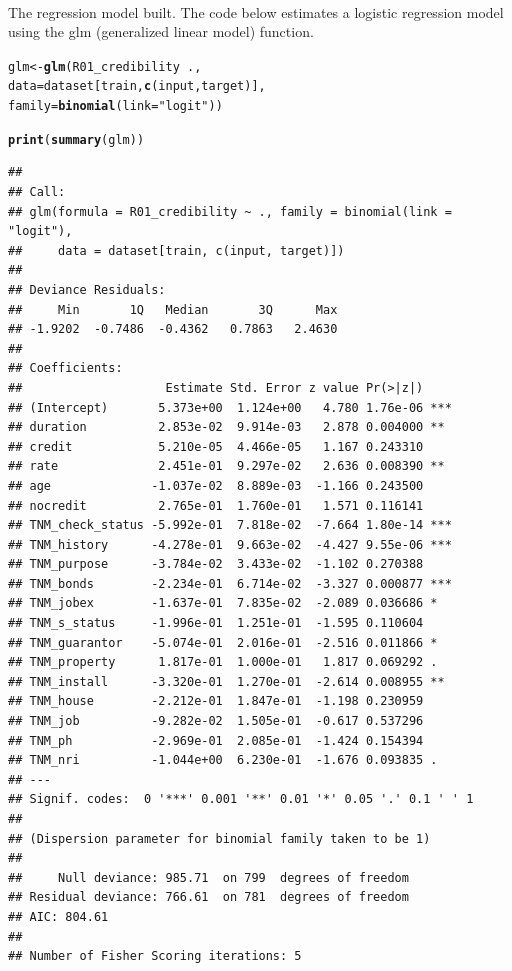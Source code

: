 \documentclass{article}\usepackage[]{graphicx}\usepackage[]{color}
\makeatletter
\newcommand{\hlstr}[1]{\textcolor[rgb]{0.192,0.494,0.8}{#1}}%
\newcommand{\hlopt}[1]{\textcolor[rgb]{0,0,0}{#1}}%
\newcommand{\hlstd}[1]{\textcolor[rgb]{0.345,0.345,0.345}{#1}}%
\newcommand{\hlkwb}[1]{\textcolor[rgb]{0.69,0.353,0.396}{#1}}%
\newcommand{\hlkwc}[1]{\textcolor[rgb]{0.333,0.667,0.333}{#1}}%
\newcommand{\hlkwd}[1]{\textcolor[rgb]{0.737,0.353,0.396}{\textbf{#1}}}%
\newenvironment{kframe}{%
 \def\at@end@of@kframe{}%
 \ifinner\ifhmode%
  \def\at@end@of@kframe{\end{minipage}}%
  \begin{minipage}{\columnwidth}%
 \fi\fi%
 \def\FrameCommand##1{\hskip\@totalleftmargin \hskip-\fboxsep
 \colorbox{shadecolor}{##1}\hskip-\fboxsep
     \hskip-\linewidth \hskip-\@totalleftmargin \hskip\columnwidth}%
 \MakeFramed {\advance\hsize-\width
   \@totalleftmargin\z@ \linewidth\hsize
   \@setminipage}}%
 {\par\unskip\endMakeFramed%
 \at@end@of@kframe}
\newenvironment{knitrout}{}{} %
\makeatother
\begin{document}
\\ The regression model built. The code below estimates a logistic regression model using the glm (generalized linear model) function.
\begin{knitrout}
\color{fgcolor}\begin{kframe}
\begin{alltt}
\hlstd{glm} \hlkwb{<-} \hlkwd{glm}\hlstd{(R01_credibility} \hlopt{~} \hlstd{.,}
               \hlkwc{data}\hlstd{=dataset[train,} \hlkwd{c}\hlstd{(input, target)],}
               \hlkwc{family}\hlstd{=}\hlkwd{binomial}\hlstd{(}\hlkwc{link}\hlstd{=}\hlstr{"logit"}\hlstd{))}

\hlkwd{print}\hlstd{(}\hlkwd{summary}\hlstd{(glm))}
\end{alltt}
\begin{verbatim}
## 
## Call:
## glm(formula = R01_credibility ~ ., family = binomial(link = "logit"), 
##     data = dataset[train, c(input, target)])
## 
## Deviance Residuals: 
##     Min       1Q   Median       3Q      Max  
## -1.9202  -0.7486  -0.4362   0.7863   2.4630  
## 
## Coefficients:
##                    Estimate Std. Error z value Pr(>|z|)    
## (Intercept)       5.373e+00  1.124e+00   4.780 1.76e-06 ***
## duration          2.853e-02  9.914e-03   2.878 0.004000 ** 
## credit            5.210e-05  4.466e-05   1.167 0.243310    
## rate              2.451e-01  9.297e-02   2.636 0.008390 ** 
## age              -1.037e-02  8.889e-03  -1.166 0.243500    
## nocredit          2.765e-01  1.760e-01   1.571 0.116141    
## TNM_check_status -5.992e-01  7.818e-02  -7.664 1.80e-14 ***
## TNM_history      -4.278e-01  9.663e-02  -4.427 9.55e-06 ***
## TNM_purpose      -3.784e-02  3.433e-02  -1.102 0.270388    
## TNM_bonds        -2.234e-01  6.714e-02  -3.327 0.000877 ***
## TNM_jobex        -1.637e-01  7.835e-02  -2.089 0.036686 *  
## TNM_s_status     -1.996e-01  1.251e-01  -1.595 0.110604    
## TNM_guarantor    -5.074e-01  2.016e-01  -2.516 0.011866 *  
## TNM_property      1.817e-01  1.000e-01   1.817 0.069292 .  
## TNM_install      -3.320e-01  1.270e-01  -2.614 0.008955 ** 
## TNM_house        -2.212e-01  1.847e-01  -1.198 0.230959    
## TNM_job          -9.282e-02  1.505e-01  -0.617 0.537296    
## TNM_ph           -2.969e-01  2.085e-01  -1.424 0.154394    
## TNM_nri          -1.044e+00  6.230e-01  -1.676 0.093835 .  
## ---
## Signif. codes:  0 '***' 0.001 '**' 0.01 '*' 0.05 '.' 0.1 ' ' 1
## 
## (Dispersion parameter for binomial family taken to be 1)
## 
##     Null deviance: 985.71  on 799  degrees of freedom
## Residual deviance: 766.61  on 781  degrees of freedom
## AIC: 804.61
## 
## Number of Fisher Scoring iterations: 5
\end{verbatim}
\end{kframe}
\end{knitrout}
\end{document}
